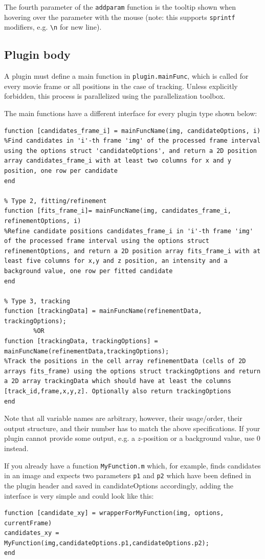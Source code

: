 \documentclass[11pt,onside]{report}
\numberwithin{equation}{chapter}
\begin{document}
The fourth parameter of the \texttt{add\textunderscore param} function is the tooltip shown when hovering over the parameter with the mouse (note: this supports \texttt{sprintf} modifiers, e.g. \texttt{\textbackslash{}n} for new line). 

\subsection{Plugin body}
A plugin must define a main function in \texttt{plugin.mainFunc}, which is called for every movie frame or all positions in the case of tracking. Unless explicitly forbidden, this process is parallelized using the parallelization toolbox.

The main functions have a different interface for every plugin type shown below:
\begin{lstlisting}[style=Matlab-editor]
% Type 1, candidate detection
function [candidates_frame_i] = mainFuncName(img, candidateOptions, i)
%Find candidates in 'i'-th frame 'img' of the processed frame interval using the options struct 'candidateOptions', and return a 2D position array candidates_frame_i with at least two columns for x and y position, one row per candidate
end
  
% Type 2, fitting/refinement
function [fits_frame_i]= mainFuncName(img, candidates_frame_i, refinementOptions, i)
%Refine candidate positions candidates_frame_i in 'i'-th frame 'img' of the processed frame interval using the options struct refinementOptions, and return a 2D position array fits_frame_i with at least five columns for x,y and z position, an intensity and a background value, one row per fitted candidate
end

% Type 3, tracking
function [trackingData] = mainFuncName(refinementData, trackingOptions);
        %OR
function [trackingData, trackingOptions] = mainFuncName(refinementData,trackingOptions);
%Track the positions in the cell array refinementData (cells of 2D arrays fits_frame) using the options struct trackingOptions and return a 2D array trackingData which should have at least the columns [track_id,frame,x,y,z]. Optionally also return trackingOptions
end
\end{lstlisting}
Note that all variable names are arbitrary, however, their usage/order, their output structure, and their number has to match the above specifications. If your plugin cannot provide some output, e.g. a $z$-position or a background value, use 0 instead. 

If you already have a function \texttt{MyFunction.m} which, for example, finds candidates in an image and expects two parameters \texttt{p1} and \texttt{p2} which have been defined in the plugin header and saved in candidateOptions accordingly, adding the interface is very simple and could look like this:
\begin{lstlisting}[style=Matlab-editor]
function [candidate_xy] = wrapperForMyFunction(img, options, currentFrame)
candidates_xy = MyFunction(img,candidateOptions.p1,candidateOptions.p2);
end
\end{lstlisting}
\end{document}
